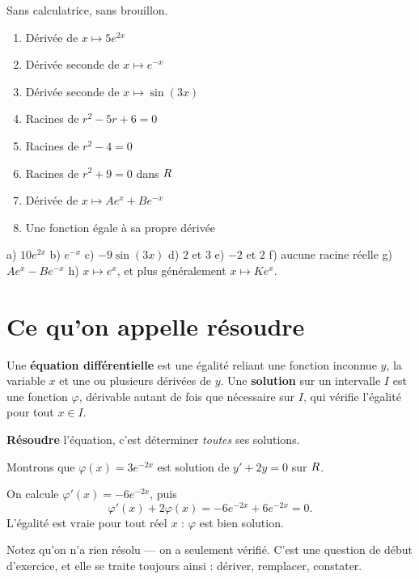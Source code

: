\begin{automatismes}
Sans calculatrice, sans brouillon.

\begin{enumerate}[label=\textbf{\alph*)}, leftmargin=*, itemsep=0.25em]
  \item Dérivée de $x \mapsto 5e^{2x}$
  \item Dérivée seconde de $x \mapsto e^{-x}$
  \item Dérivée seconde de $x \mapsto \sin(3x)$
  \item Racines de $r^{2}-5r+6 = 0$
  \item Racines de $r^{2}-4 = 0$
  \item Racines de $r^{2}+9 = 0$ dans $R$
  \item Dérivée de $x \mapsto Ae^{x}+Be^{-x}$
  \item Une fonction égale à sa propre dérivée
\end{enumerate}
\end{automatismes}

\begin{corrige}[automatismes]
a) $10e^{2x}$ \quad b) $e^{-x}$ \quad c) $-9\sin(3x)$ \quad d) $2$ et $3$ \quad
e) $-2$ et $2$ \quad f) aucune racine réelle \quad
g) $Ae^{x}-Be^{-x}$ \quad h) $x \mapsto e^{x}$, et plus généralement
$x \mapsto Ke^{x}$.
\end{corrige}

\section{Ce qu'on appelle résoudre}

\begin{definition}
Une \textbf{équation différentielle} est une égalité reliant une fonction
inconnue $y$, la variable $x$ et une ou plusieurs dérivées de $y$. Une
\textbf{solution} sur un intervalle $I$ est une fonction $\varphi$, dérivable
autant de fois que nécessaire sur $I$, qui vérifie l'égalité pour tout
$x \in I$.

\textbf{Résoudre} l'équation, c'est déterminer \emph{toutes} ses solutions.
\end{definition}

\begin{exemple}
Montrons que $\varphi(x) = 3e^{-2x}$ est solution de $y' + 2y = 0$ sur $R$.

On calcule $\varphi'(x) = -6e^{-2x}$, puis
\[
  \varphi'(x) + 2\varphi(x) = -6e^{-2x} + 6e^{-2x} = 0 .
\]
L'égalité est vraie pour tout réel $x$ : $\varphi$ est bien solution.

\smallskip
Notez qu'on n'a rien résolu — on a seulement vérifié. C'est une question de
début d'exercice, et elle se traite toujours ainsi : dériver, remplacer,
constater.
\end{exemple}

